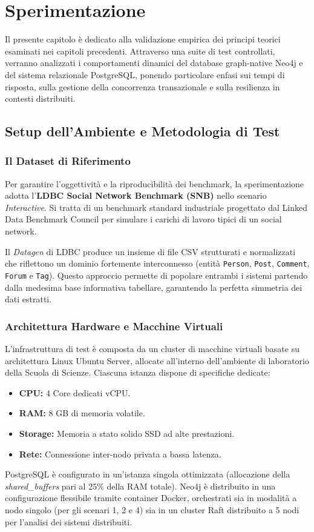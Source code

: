 \chapter{Sperimentazione}
\label{ch:sperimentazione}

Il presente capitolo è dedicato alla validazione empirica dei principi teorici esaminati nei capitoli precedenti. Attraverso una suite di test controllati, verranno analizzati i comportamenti dinamici del database graph-native Neo4j e del sistema relazionale PostgreSQL, ponendo particolare enfasi sui tempi di risposta, sulla gestione della concorrenza transazionale e sulla resilienza in contesti distribuiti.

\section{Setup dell'Ambiente e Metodologia di Test}
\label{sec:setup_metodologia}

\subsection{Il Dataset di Riferimento}
Per garantire l'oggettività e la riproducibilità dei benchmark, la sperimentazione adotta l'\textbf{LDBC Social Network Benchmark (SNB)} nello scenario \textit{Interactive}. Si tratta di un benchmark standard industriale progettato dal Linked Data Benchmark Council per simulare i carichi di lavoro tipici di un social network.

Il \textit{Datagen} di LDBC produce un insieme di file CSV strutturati e normalizzati che riflettono un dominio fortemente interconnesso (entità \texttt{Person}, \texttt{Post}, \texttt{Comment}, \texttt{Forum} e \texttt{Tag}). Questo approccio permette di popolare entrambi i sistemi partendo dalla medesima base informativa tabellare, garantendo la perfetta simmetria dei dati estratti.

\subsection{Architettura Hardware e Macchine Virtuali}
L'infrastruttura di test è composta da un cluster di macchine virtuali basate su architettura Linux Ubuntu Server, allocate all'interno dell'ambiente di laboratorio della Scuola di Scienze. Ciascuna istanza dispone di specifiche dedicate:
\begin{itemize}
  \item \textbf{CPU:} 4 Core dedicati vCPU.
  \item \textbf{RAM:} 8 GB di memoria volatile.
  \item \textbf{Storage:} Memoria a stato solido SSD ad alte prestazioni.
  \item \textbf{Rete:} Connessione inter-nodo privata a bassa latenza.
\end{itemize}
PostgreSQL è configurato in un'istanza singola ottimizzata (allocazione della \textit{shared\_buffers} pari al 25\% della RAM totale). Neo4j è distribuito in una configurazione flessibile tramite container Docker, orchestrati sia in modalità a nodo singolo (per gli scenari 1, 2 e 4) sia in un cluster Raft distribuito a 5 nodi per l'analisi dei sistemi distribuiti.

